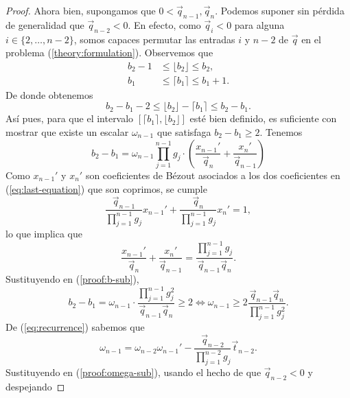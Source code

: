 \begin{proof}
	Ahora bien, supongamos que $0 < \vec{q}_{n - 1}, \vec{q}_n$. Podemos suponer sin pérdida de
	generalidad que $\vec{q}_{n - 2} < 0$. En efecto, como $\vec{q}_i < 0$ para alguna $i \in
	\lbrace 2, \ldots, n - 2\rbrace$, somos capaces permutar las entradas $i$ y $n - 2$ de $\vec{q}$ en
	el problema (\ref{theory:formulation}). Observemos que
	\begin{align*}
		b_2 - 1 &\leq \lfloor b_2 \rfloor \leq b_2, \\
		b_1 &\leq \lceil b_1 \rceil \leq b_1 + 1.
	\end{align*}
	De donde obtenemos
	\begin{equation*}
		b_2 - b_1 - 2 \leq \lfloor b_2 \rfloor - \lceil b_1 \rceil \leq b_2 - b_1.
	\end{equation*}
	Así pues, para que el intervalo $[\lceil b_1 \rceil, \lfloor b_2 \rfloor]$ esté bien definido,
	es suficiente con mostrar que existe un escalar $\omega_{n - 1}$ que satisfaga $b_2 - b_1 \geq
	2$. Tenemos
	\begin{equation}
		\label{proof:b-sub}
		b_2 - b_1 = \omega_{n - 1}\prod_{j = 1}^{n-1}g_j \cdot
			\left(\frac{x_{n-1}'}{\vec{q}_n} + \frac{x_n'}{\vec{q}_{n - 1}}\right)
	\end{equation}
	Como $x_{n - 1}'$ y $x_n'$ son coeficientes de Bézout asociados a los dos coeficientes en
	(\ref{eq:last-equation}) que son coprimos, se cumple
	\begin{equation*}
		\frac{\vec{q}_{n - 1}}{\prod_{j = 1}^{n-1}g_j}x_{n-1}' +
		\frac{\vec{q}_{n}}{\prod_{j = 1}^{n-1}g_j}x_{n}' = 1,
	\end{equation*}
	lo que implica que
	\begin{equation*}
		\frac{x_{n-1}'}{\vec{q}_n} + \frac{x_n'}{\vec{q}_{n - 1}} = \frac{\prod_{j =
		1}^{n-1}g_j}{\vec{q}_{n-1}\vec{q}_n}.
	\end{equation*}
	Sustituyendo en (\ref{proof:b-sub}),
	\begin{equation}
		\label{proof:omega-sub}
		b_2 - b_1 = \omega_{n-1}\cdot \frac{\prod_{j=1}^{n-1}g_j^2}{\vec{q}_{n-1}\vec{q}_n} \geq 2
		\iff \omega_{n-1} \geq 2\frac{\vec{q}_{n-1}\vec{q}_n}{\prod_{j=1}^{n-1}g_j^2}.
	\end{equation}
	De (\ref{eq:recurrence}) sabemos que
	\begin{equation*}
		\omega_{n-1} = \omega_{n-2}\omega_{n-1}' -
		\frac{\vec{q}_{n-2}}{\prod_{j=1}^{n-2}g_j}\vec{t}_{n-2}.
	\end{equation*}
	Sustituyendo en (\ref{proof:omega-sub}), usando el hecho de que $\vec{q}_{n-2} < 0$ y despejando

\end{proof}
